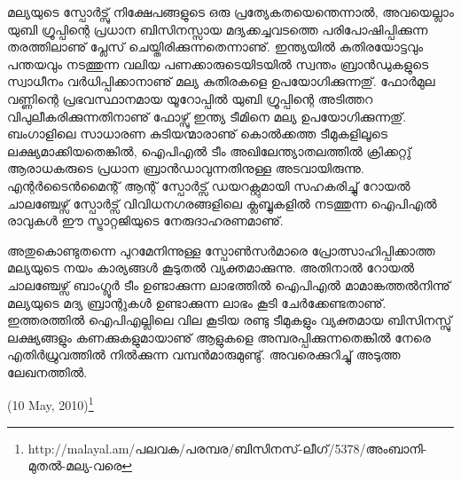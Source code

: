 മല്യയുടെ സ്പോര്‍ട്സു് നിക്ഷേപങ്ങളുടെ ഒരു പ്രത്യേകതയെന്തെന്നാല്‍, അവയെല്ലാം യുബി ഗ്രൂപ്പിന്റെ പ്രധാന ബിസിനസ്സായ 
മദ്യക്കച്ചവടത്തെ പരിപോഷിപ്പിക്കുന്ന തരത്തിലാണു് പ്ലേസ് ചെയ്തിരിക്കുന്നതെന്നാണു്. ഇന്ത്യയില്‍ കുതിരയോട്ടവും പന്തയവും 
നടത്തുന്ന വലിയ പണക്കാരുടെയിടയില്‍ സ്വന്തം ബ്രാന്‍ഡുകളുടെ സ്വാധീനം വര്‍ധിപ്പിക്കാനാണു് മല്യ കുതിരകളെ 
ഉപയോഗിക്കുന്നതു്. ഫോര്‍മുല വണ്ണിന്റെ പ്രഭവസ്ഥാനമായ യൂറോപ്പില്‍ യുബി ഗ്രൂപ്പിന്റെ അടിത്തറ വിപുലീകരിക്കുന്നതിനാണു് 
ഫോഴ്സു് ഇന്ത്യ ടീമിനെ മല്യ ഉപയോഗിക്കുന്നതു്. ബംഗാളിലെ സാധാരണ കുടിയന്മാരാണു് കൊല്‍ക്കത്ത ടീമുകളിലൂടെ 
ലക്ഷ്യമാക്കിയതെങ്കില്‍, ഐപിഎല്‍ ടീം അഖിലേന്ത്യാതലത്തില്‍ ക്രിക്കറ്റു് ആരാധകരുടെ പ്രധാന ബ്രാന്‍ഡാവുന്നതിനുള്ള 
അടവായിരുന്നു. എന്റര്‍ടൈന്‍മൈന്റ് ആന്റ് സ്പോര്‍ട്സ് ഡയറക്റ്റുമായി സഹകരിച്ചു് റോയല്‍ ചാലഞ്ചേഴ്സ് സ്പോര്‍ട്സ് 
വിവിധനഗരങ്ങളിലെ ക്ലബ്ബുകളില്‍ നടത്തുന്ന ഐപിഎല്‍ രാവുകള്‍ ഈ സ്ട്രാറ്റജിയുടെ നേരുദാഹരണമാണു്.

അതുകൊണ്ടുതന്നെ പുറമേനിന്നുള്ള സ്പോണ്‍സര്‍മാരെ പ്രോത്സാഹിപ്പിക്കാത്ത മല്യയുടെ നയം കാര്യങ്ങള്‍ കൂടുതല്‍ 
വ്യക്തമാക്കുന്നു. അതിനാല്‍ റോയല്‍ ചാലഞ്ചേഴ്സ് ബാംഗ്ലൂര്‍ ടീം ഉണ്ടാക്കുന്ന ലാഭത്തില്‍ ഐപിഎല്‍ മാമാങ്കത്തല്‍നിന്നു് 
മല്യയുടെ മദ്യ ബ്രാന്റുകള്‍ ഉണ്ടാക്കുന്ന ലാഭം കൂടി ചേര്‍ക്കേണ്ടതാണു്. ഇത്തരത്തില്‍ ഐപിഎല്ലിലെ വില കൂടിയ 
രണ്ടു ടീമുകളും വ്യക്തമായ ബിസിനസ്സു് ലക്ഷ്യങ്ങളും കണക്കുകളുമായാണു് ആളുകളെ അമ്പരപ്പിക്കുന്നതെങ്കില്‍ നേരെ 
എതിര്‍ധ്രുവത്തില്‍ നില്‍ക്കുന്ന വമ്പന്‍മാരുമുണ്ടു്. അവരെക്കുറിച്ചു് അടുത്ത ലേഖനത്തില്‍.

\hspace*{2em}(10 May, 2010)\footnote{http://malayal.am/പലവക/പരമ്പര/ബിസിനസ്-ലീഗ്/5378/അംബാനി-മുതല്‍-മല്യ-വരെ}

\newpage
